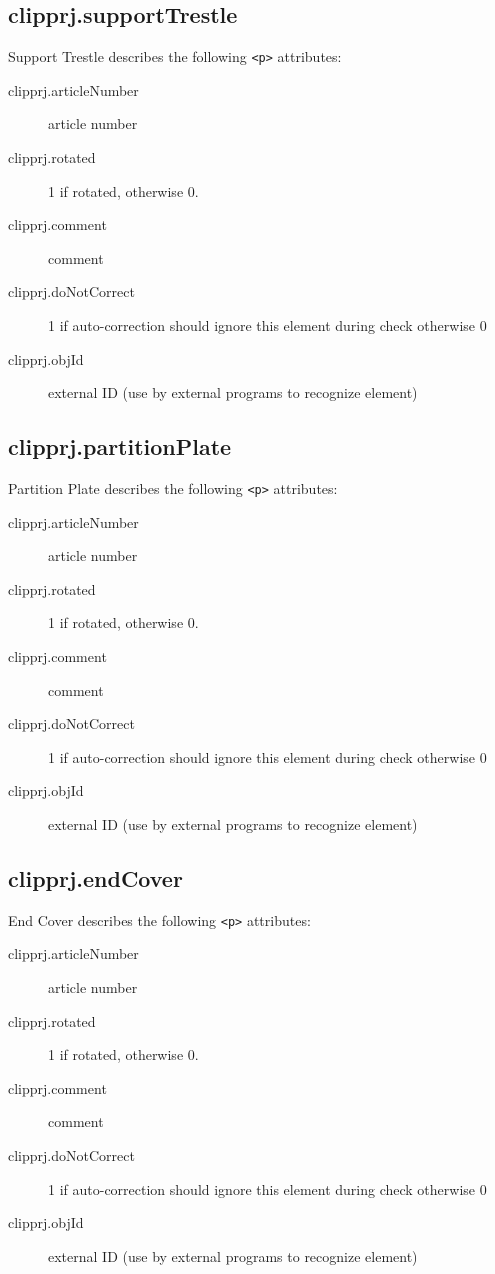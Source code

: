 \documentclass[%
	a4paper,
	oneside,
	listof=numbered,
	parskip=half,
	headsepline=true,
	footsepline=false,
	normalheadings,
	0.7headlines,
	headexclude,
	]{scrbook}
\begin{document}
\subsection{clipprj.supportTrestle}
 
Support Trestle describes the following \verb|<p>| attributes: 

\begin{description}
	\item[clipprj.articleNumber] article number 
	\item[clipprj.rotated] 1 if rotated, otherwise 0. 
	\item[clipprj.comment] comment 
	\item[clipprj.doNotCorrect] 1 if auto-correction should ignore this element during check otherwise 0 
	\item[clipprj.objId] external ID (use by external programs to recognize element) 
\end{description}

\subsection{clipprj.partitionPlate}
 
Partition Plate describes the following \verb|<p>| attributes: 

\begin{description}
	\item[clipprj.articleNumber] article number 
	\item[clipprj.rotated] 1 if rotated, otherwise 0. 
	\item[clipprj.comment] comment 
	\item[clipprj.doNotCorrect] 1 if auto-correction should ignore this element during check otherwise 0 
	\item[clipprj.objId] external ID (use by external programs to recognize element) 
\end{description}

\subsection{clipprj.endCover}
 
End Cover describes the following \verb|<p>| attributes: 

\begin{description}
	\item[clipprj.articleNumber] article number 
	\item[clipprj.rotated] 1 if rotated, otherwise 0. 
	\item[clipprj.comment] comment 
	\item[clipprj.doNotCorrect] 1 if auto-correction should ignore this element during check otherwise 0 
	\item[clipprj.objId] external ID (use by external programs to recognize element) 
\end{description}
\end{document}
